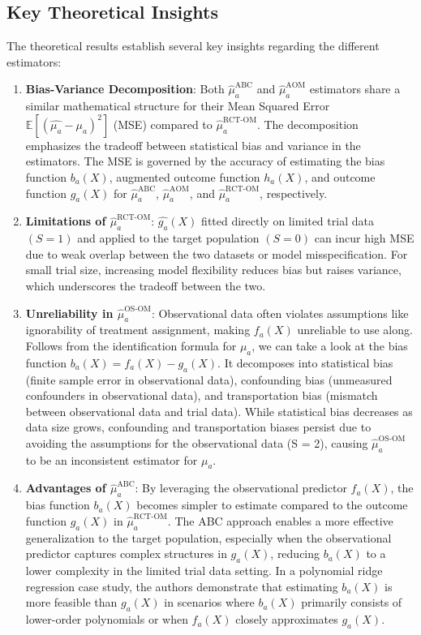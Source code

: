 \documentclass[12pt, oneside]{amsart}
\theoremstyle{definition}
\theoremstyle{remark}
\numberwithin{equation}{section}
\begin{document}
\subsection{Key Theoretical Insights}
The theoretical results establish several key insights regarding the different estimators:
\begin{enumerate}
    \item \textbf{Bias-Variance Decomposition}: Both $\hat{\mu}_a^{\text{ABC}}$ and $\hat{\mu}_a^{\text{AOM}}$ estimators share a similar mathematical structure for their Mean Squared Error $\mathbb{E}[(\hat{\mu_a} - \mu_a)^2 ]$ (MSE) compared to $\hat{\mu}_a^{\text{RCT-OM}}$. The decomposition emphasizes the tradeoff between statistical bias and variance in the estimators. The MSE is governed by the accuracy of estimating the bias function $b_a(X)$, augmented outcome function $h_a(X)$, and outcome function $g_a(X)$ for $\hat{\mu}_a^{\text{ABC}}$, $\hat{\mu}_a^{\text{AOM}}$, and $\hat{\mu}_a^{\text{RCT-OM}}$, respectively.

    \item \textbf{Limitations of $\hat{\mu}_a^{\text{RCT-OM}}$}: $\hat{g_a}(X)$ fitted directly on limited trial data $(S=1)$ and applied to the target population $(S=0)$ can incur high MSE due to weak overlap between the two datasets or model misspecification. For small trial size, increasing model flexibility reduces bias but raises variance, which underscores the tradeoff between the two. 

    \item \textbf{Unreliability in $\hat{\mu}_a^{\text{OS-OM}}$}: Observational data often violates assumptions like ignorability of treatment assignment, making $f_a(X)$ unreliable to use along. Follows from the identification formula for $\mu_a$, we can take a look at the bias function $b_a(X) = f_a(X) - g_a(X)$. It decomposes into statistical bias (finite sample error in observational data), confounding bias (unmeasured confounders in observational data), and transportation bias (mismatch between observational data and trial data). While statistical bias decreases as data size grows, confounding and transportation biases persist due to avoiding the assumptions for the observational data (S = 2), causing $\hat{\mu}_a^{\text{OS-OM}}$ to be an inconsistent estimator for $\mu_a$. 

    \item \textbf{Advantages of $\hat{\mu}_a^{\text{ABC}}$}: By leveraging the observational predictor $f_a(X)$, the bias function $b_a(X)$ becomes simpler to estimate compared to the outcome function $g_a(X)$ in $\hat{\mu}_a^{\text{RCT-OM}}$. The ABC approach enables a more effective generalization to the target population, especially when the observational predictor captures complex structures in $g_a(X)$, reducing $b_a(X)$ to a lower complexity in the limited trial data setting. In a polynomial ridge regression case study, the authors demonstrate that estimating $b_a(X)$ is more feasible than $g_a(X)$ in scenarios where $b_a(X)$ primarily consists of lower-order polynomials or when $f_a(X)$ closely approximates $g_a(X)$. 


\end{enumerate}
\end{document}
